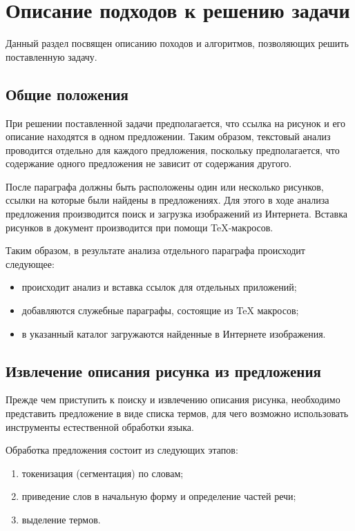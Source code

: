 \chapter{Описание подходов к решению задачи}

Данный раздел посвящен описанию походов и алгоритмов, позволяющих решить
поставленную задачу.

\section{Общие положения}

При решении поставленной задачи предполагается, что ссылка на рисунок и его
описание находятся в одном предложении. Таким образом, текстовый анализ
проводится отдельно для каждого предложения, поскольку предполагается, что
содержание одного предложения не зависит от содержания другого.

После параграфа должны быть расположены один или несколько рисунков, ссылки на
которые были найдены в предложениях. Для этого в ходе анализа предложения
производится поиск и загрузка изображений из Интернета. Вставка рисунков в
документ производится при помощи TeX-макросов.

Таким образом, в результате анализа отдельного параграфа происходит следующее:
\begin{itemize}
    \item происходит анализ и вставка ссылок для отдельных приложений;
    \item добавляются служебные параграфы, состоящие из TeX макросов;
    \item в указанный каталог загружаются найденные в Интернете изображения.
\end{itemize}

\section{Извлечение описания рисунка из предложения}

Прежде чем приступить к поиску и извлечению описания рисунка, необходимо
представить предложение в виде списка термов, для чего возможно использовать
инструменты естественной обработки языка.

Обработка предложения состоит из следующих этапов:
\begin{enumerate}
    \item токенизация (сегментация) по словам;
    \item приведение слов в начальную форму и определение частей речи;
    \item выделение термов.
\end{enumerate}

